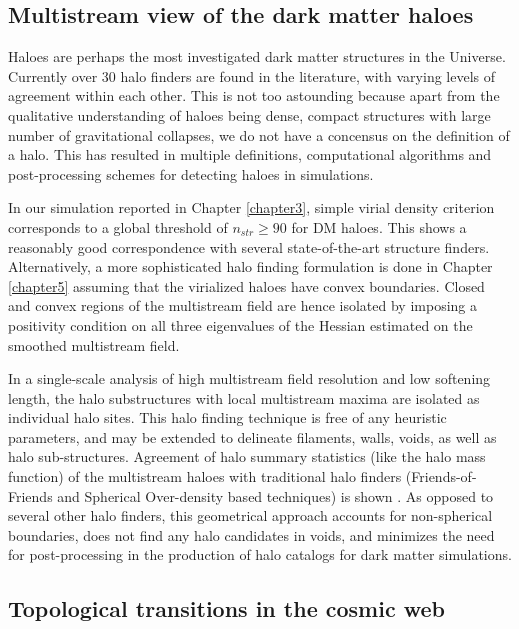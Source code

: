 \subsection{Multistream view of the dark matter haloes}


Haloes are perhaps the most investigated dark matter structures in the Universe. Currently over 30 halo finders are found in the literature, with varying levels of agreement within each other. This is not too astounding because apart from the qualitative understanding of haloes being dense, compact structures with large number of gravitational collapses, we do not have a concensus on the definition of a halo. This has resulted in multiple definitions, computational algorithms and post-processing schemes for detecting haloes in simulations. 

In our simulation reported in Chapter \ref{chapter3}, simple virial density criterion corresponds to a global threshold of $n_{str} \geq 90$ for DM haloes. This shows a reasonably good correspondence with several state-of-the-art structure finders. Alternatively, a more sophisticated halo finding formulation is done in Chapter \ref{chapter5} assuming that the virialized haloes have convex boundaries. Closed and convex regions of the multistream field are hence isolated by imposing a positivity condition on all three eigenvalues of the Hessian estimated on the smoothed multistream field. 


In a single-scale analysis of high multistream field resolution and low softening length, the halo substructures with local multistream maxima are isolated as individual halo sites. This halo finding technique is free of any heuristic parameters, and may be extended to delineate filaments, walls, voids, as well as halo sub-structures. Agreement of halo summary statistics (like the halo mass function) of the multistream haloes with traditional halo finders (Friends-of-Friends and Spherical Over-density based techniques) is shown \cite{Ramachandra2017b}. As opposed to several other halo finders, this geometrical approach accounts for non-spherical boundaries, does not find any halo candidates in voids, and minimizes the need for post-processing in the production of halo catalogs for dark matter simulations.   

\subsection{Topological transitions in the cosmic web}

